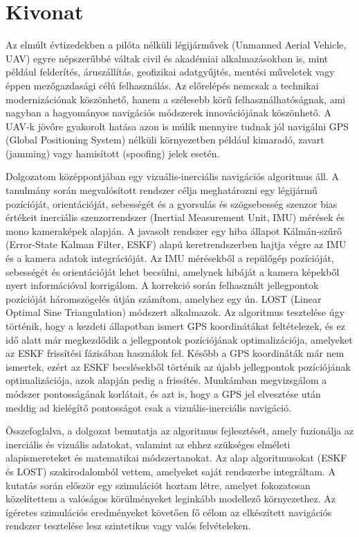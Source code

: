\selecthungarian{}
\chapter*{Kivonat}

Az elmúlt évtizedekben a pilóta nélküli légijárművek (Unmanned Aerial Vehicle, UAV) egyre népszerűbbé váltak civil és akadémiai alkalmazásokban is, mint például felderítés, áruszállítás, geofizikai adatgyűjtés, mentési műveletek vagy éppen mezőgazdasági célú felhasználás. Az előrelépés nemcsak a technikai modernizációnak köszönhető, hanem a szélesebb körű felhasználhatóságnak, ami nagyban a hagyományos navigációs módszerek innovációjának köszönhető. A UAV-k jövőre gyakorolt hatása azon is múlik mennyire tudnak jól navigálni GPS (Global Positioning System) nélküli környezetben például kimaradó, zavart (jamming) vagy hamisított (spoofing) jelek esetén.

Dolgozatom középpontjában egy vizuális-inerciális navigációs algoritmus áll. A tanulmány során megvalósított rendszer célja meghatározni egy légijármű pozícióját, orientációját, sebességét és a gyorsulás és szögsebesség szenzor bias értékeit inerciális szenzorrendszer (Inertial Measurement Unit, IMU) mérések és mono kameraképek alapján. A javasolt rendszer egy hiba állapot Kálmán-szűrő (Error-State Kalman Filter, ESKF) alapú keretrendszerben hajtja végre az IMU és a kamera adatok integrációját. Az IMU mérésekből a repülőgép pozícióját, sebességét és orientációját lehet becsülni, amelynek hibáját a kamera képekből nyert információval korrigálom. A korrekció során felhasznált jellegpontok pozícióját háromszögelés útján számítom, amelyhez egy ún. LOST (Linear Optimal Sine Triangulation) módszert alkalmazok. Az algoritmus tesztelése úgy történik, hogy a kezdeti állapotban ismert GPS koordinátákat feltételezek, és ez idő alatt már megkezdődik a jellegpontok pozíciójának optimalizációja, amelyeket az ESKF frissítési fázisában használok fel. Később a GPS koordináták már nem ismertek, ezért az ESKF becslésekből történik az újabb jellegpontok pozíciójának optimalizációja, azok alapján pedig a frissítés. Munkámban megvizsgálom a módszer pontosságának korlátait, és azt is, hogy a GPS jel elvesztése után meddig ad kielégítő pontosságot csak a vizuális-inerciális navigáció.

Összefoglalva, a dolgozat bemutatja az algoritmus fejlesztését, amely fuzionálja az inerciális és vizuális adatokat, valamint az ehhez szükséges elméleti alapismereteket és matematikai módszertanokat. Az alap algoritmusokat (ESKF és LOST) szakirodalomból vettem, amelyeket saját rendszerbe integráltam. A kutatás során először egy szimulációt hoztam létre, amelyet fokozatosan közelítettem a valóságos körülményeket leginkább modellező környezethez. Az ígéretes szimulációs eredményeket követően fő célom az elkészített navigációs rendszer tesztelése lesz szintetikus vagy valós felvételeken.


